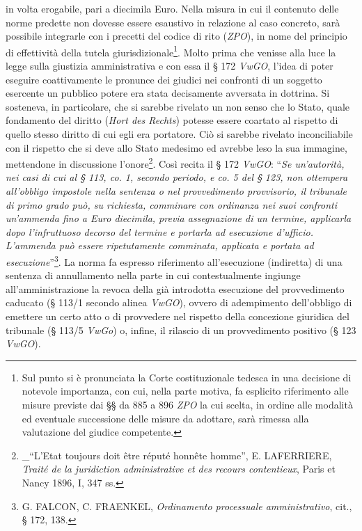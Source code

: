 \documentclass[12pt,it,a4paper,]{report}
\begin{document}
in volta erogabile, pari a diecimila Euro. Nella misura in cui il
contenuto delle norme predette non dovesse essere esaustivo in relazione
al caso concreto, sarà possibile integrarle con i precetti del codice di
rito (\emph{ZPO}), in nome del principio di effettività della tutela
giurisdizionale\footnote{Sul punto si è pronunciata la Corte
  costituzionale tedesca in una decisione di notevole importanza, con
  cui, nella parte motiva, fa esplicito riferimento alle misure previste
  dai §§ da 885 a 896 \emph{ZPO} la cui scelta, in ordine alle modalità
  ed eventuale successione delle misure da adottare, sarà rimessa alla
  valutazione del giudice competente.}. Molto prima che venisse alla
luce la legge sulla giustizia amministrativa e con essa il § 172
\emph{VwGO}, l'idea di poter eseguire coattivamente le pronunce dei
giudici nei confronti di un soggetto esercente un pubblico potere era
stata decisamente avversata in dottrina. Si sosteneva, in particolare,
che si sarebbe rivelato un non senso che lo Stato, quale fondamento del
diritto (\emph{Hort des Rechts}) potesse essere coartato al rispetto di
quello stesso diritto di cui egli era portatore. Ciò si sarebbe rivelato
inconciliabile con il rispetto che si deve allo Stato medesimo ed
avrebbe leso la sua immagine, mettendone in discussione
l'onore\footnote{\_``L'Etat toujours doit être réputé honnête homme'',
  E. LAFERRIERE, \emph{Traité de la juridiction administrative et des
  recours contentieux}, Paris et Nancy 1896, I, 347 ss.}. Così recita il
§ 172 \emph{VwGO}: ``\emph{Se un'autorità, nei casi di cui al § 113, co.
1, secondo periodo, e co. 5 del § 123, non ottempera all'obbligo
impostole nella sentenza o nel provvedimento provvisorio, il tribunale
di primo grado può, su richiesta, comminare con ordinanza nei suoi
confronti un'ammenda fino a Euro diecimila, previa assegnazione di un
termine, applicarla dopo l'infruttuoso decorso del termine e portarla ad
esecuzione d'ufficio. L'ammenda può essere ripetutamente comminata,
applicata e portata ad esecuzione}''\footnote{G. FALCON, C. FRAENKEL,
  \emph{Ordinamento processuale amministrativo}, cit., § 172, 138.}. La
norma fa espresso riferimento all'esecuzione (indiretta) di una sentenza
di annullamento nella parte in cui contestualmente ingiunge
all'amministrazione la revoca della già introdotta esecuzione del
provvedimento caducato (§ 113/1 secondo alinea \emph{VwGO}), ovvero di
adempimento dell'obbligo di emettere un certo atto o di provvedere nel
rispetto della concezione giuridica del tribunale (§ 113/5 \emph{VwGo})
o, infine, il rilascio di un provvedimento positivo (§ 123 \emph{VwGO}).
\end{document}
